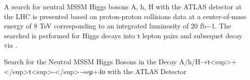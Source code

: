 A search for neutral MSSM Higgs bosons A, h, H with the ATLAS detector at the LHC is presented based on proton-proton collisions data at a center-of-mass energy of 8 TeV corresponding to an integrated luminosity of 20 fb−1. The searched is performed for Higgs decays into τ lepton pairs and subsequet decay via .



Search for the Neutral MSSM Higgs Bosons in the Decay A/h/H→τ<sup>+</sup>τ<sup>-</sup>→eμ+4υ with the ATLAS Detector
